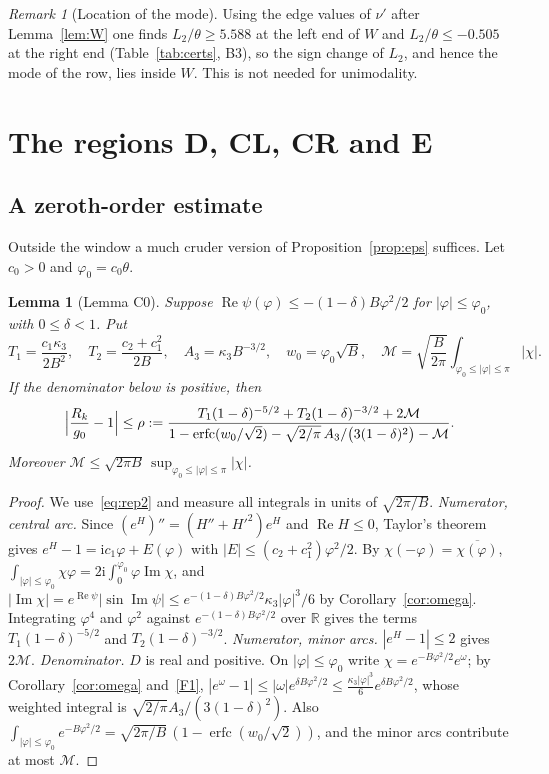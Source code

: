 \documentclass[11pt]{amsart}
\newtheorem{lemma}[theorem]{Lemma}
\theoremstyle{definition}
\theoremstyle{remark}
\newtheorem{remark}[theorem]{Remark}
\numberwithin{equation}{section}
\newcommand{\RR}{\mathbb{R}}
\newcommand{\erfc}{\operatorname{erfc}}
\newcommand{\re}{\operatorname{Re}}
\newcommand{\im}{\operatorname{Im}}
\newcommand{\ii}{\mathrm{i}}
\begin{document}
\begin{remark}[Location of the mode]
Using the edge values of $\nu'$ after Lemma~\ref{lem:W} one finds $L_2/\theta\ge5.588$ at the left end of $W$ and
$L_2/\theta\le-0.505$ at the right end (Table~\ref{tab:certs}, B3), so the sign change of $L_2$, and hence the mode of the row, lies
inside $W$. This is not needed for unimodality.
\end{remark}

\section{The regions D, CL, CR and E}\label{sec:CLCR}

\subsection{A zeroth-order estimate}
Outside the window a much cruder version of Proposition~\ref{prop:eps} suffices. Let $c_0>0$ and $\varphi_0=c_0\theta$.

\begin{lemma}[Lemma C0]\label{lem:C0}
Suppose $\re\psi(\varphi)\le-(1-\delta)B\varphi^2/2$ for $|\varphi|\le\varphi_0$, with $0\le\delta<1$. Put
\[
  T_1=\frac{c_1\kappa_3}{2B^2},\quad T_2=\frac{c_2+c_1^2}{2B},\quad A_3=\kappa_3B^{-3/2},\quad w_0=\varphi_0\sqrt B,\quad
  \mathcal M=\sqrt{\frac B{2\pi}}\int_{\varphi_0\le|\varphi|\le\pi}|\chi| .
\]
If the denominator below is positive, then
\[
  \Bigl|\frac{R_k}{g_0}-1\Bigr|\le\rho:=\frac{T_1(1-\delta)^{-5/2}+T_2(1-\delta)^{-3/2}+2\mathcal M}
  {1-\erfc(w_0/\sqrt2)-\sqrt{2/\pi}\,A_3/\bigl(3(1-\delta)^2\bigr)-\mathcal M}.
\]
Moreover $\mathcal M\le\sqrt{2\pi B}\,\sup_{\varphi_0\le|\varphi|\le\pi}|\chi|$.
\end{lemma}

\begin{proof}
We use~\eqref{eq:rep2} and measure all integrals in units of $\sqrt{2\pi/B}$.
\emph{Numerator, central arc.} Since $(e^H)''=(H''+H'^2)e^H$ and $\re H\le0$, Taylor's theorem gives $e^H-1=\ii c_1\varphi+E(\varphi)$ with
$|E|\le(c_2+c_1^2)\varphi^2/2$. By $\chi(-\varphi)=\overline{\chi(\varphi)}$, $\int_{|\varphi|\le\varphi_0}\chi\varphi=2\ii\int_0^{\varphi_0}\varphi\im\chi$,
and $|\im\chi|=e^{\re\psi}|\sin\im\psi|\le e^{-(1-\delta)B\varphi^2/2}\kappa_3|\varphi|^3/6$ by Corollary~\ref{cor:omega}. Integrating
$\varphi^4$ and $\varphi^2$ against $e^{-(1-\delta)B\varphi^2/2}$ over $\RR$ gives the terms $T_1(1-\delta)^{-5/2}$ and $T_2(1-\delta)^{-3/2}$.
\emph{Numerator, minor arcs.} $|e^H-1|\le2$ gives $2\mathcal M$.
\emph{Denominator.} $D$ is real and positive. On $|\varphi|\le\varphi_0$ write $\chi=e^{-B\varphi^2/2}e^\omega$; by
Corollary~\ref{cor:omega} and~\ref{F1}, $|e^\omega-1|\le|\omega|e^{\delta B\varphi^2/2}\le\frac{\kappa_3|\varphi|^3}6e^{\delta B\varphi^2/2}$, whose
weighted integral is $\sqrt{2/\pi}A_3/(3(1-\delta)^2)$. Also $\int_{|\varphi|\le\varphi_0}e^{-B\varphi^2/2}=\sqrt{2\pi/B}\,(1-\erfc(w_0/\sqrt2))$,
and the minor arcs contribute at most $\mathcal M$.
\end{proof}
\end{document}

